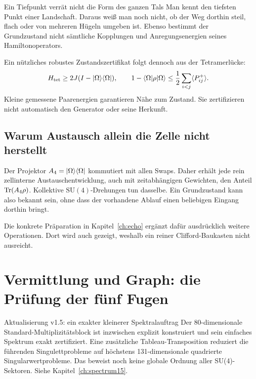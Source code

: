 \begin{bild}{Ein Tiefpunkt verrät nicht die Form des ganzen Tals}
Man kennt den tiefsten Punkt einer Landschaft. Daraus weiß man noch nicht, ob der Weg dorthin steil, flach oder von mehreren Hügeln umgeben ist. Ebenso bestimmt der Grundzustand nicht sämtliche Kopplungen und Anregungsenergien seines Hamiltonoperators.
\end{bild}

Ein nützliches robustes Zustandszertifikat folgt dennoch aus der Tetramerlücke:
\begin{equation}
H_{\mathrm{tet}}\ge2J(I-\lvert\Omega\rangle\langle\Omega\rvert),\qquad
1-\langle\Omega\rvert\rho\lvert\Omega\rangle\le\frac12\sum_{i<j}\langle P^+_{ij}\rangle.
\end{equation}
Kleine gemessene Paarenergien garantieren Nähe zum Zustand. Sie zertifizieren nicht automatisch den Generator oder seine Herkunft.

\section{Warum Austausch allein die Zelle nicht herstellt}


Der Projektor $A_4=\lvert\Omega\rangle\langle\Omega\rvert$ kommutiert mit allen Swaps. Daher erhält jede rein zellinterne Austauschentwicklung, auch mit zeitabhängigen Gewichten, den Anteil $\operatorname{Tr}(A_4\rho)$. Kollektive $\mathrm{SU}(4)$-Drehungen tun dasselbe. Ein Grundzustand kann also bekannt sein, ohne dass der vorhandene Ablauf einen beliebigen Eingang dorthin bringt.

Die konkrete Präparation in Kapitel~\ref{ch:echo} ergänzt dafür ausdrücklich weitere Operationen. Dort wird auch gezeigt, weshalb ein reiner Clifford-Baukasten nicht ausreicht.

\chapter{Vermittlung und Graph: die Prüfung der fünf Fugen}
\label{ch:fugen}
\begin{bild}{Aktualisierung v1.5: ein exakter kleinerer Spektralauftrag}
Der 80-dimensionale Standard-Multiplizitätsblock ist inzwischen explizit konstruiert und sein einfaches Spektrum exakt zertifiziert. Eine zusätzliche Tableau-Transposition reduziert die führenden Singulettprobleme auf höchstens 131-dimensionale quadrierte Singularwertprobleme. Das beweist noch keine globale Ordnung aller SU(4)-Sektoren. Siehe Kapitel~\ref{ch:spectrum15}.
\end{bild}
